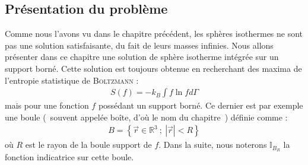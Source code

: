 \subsection{Présentation du problème}
	Comme nous l'avons vu dans le chapitre précédent, les sphères isothermes ne sont pas une solution satisfaisante, du fait de leurs masses infinies.
	Nous allons présenter dans ce chapitre une solution de sphère isotherme intégrée sur un support borné. Cette solution est toujours obtenue en recherchant des maxima  de l'entropie statistique de \textsc{Boltzmann} :
	\begin{align*}
		S(f) = - k_B \int f \ln f d\Gamma
	\end{align*}
	mais pour une fonction $f$ possédant un support borné. Ce dernier est par exemple une boule (~souvent appelée boîte, d'où le nom du chapitre~) définie comme :
	\begin{align}
		B = \left\{ \vec{r} \in \mathbb{R}^3\ ;\ \left|\vec{r}\right| < R\right\}
	\end{align}
	où $R$ est le rayon de la boule support de $f$. Dans la suite, nous noterons $\mathbb{I}_{B_R}$ la fonction indicatrice sur cette boule.

